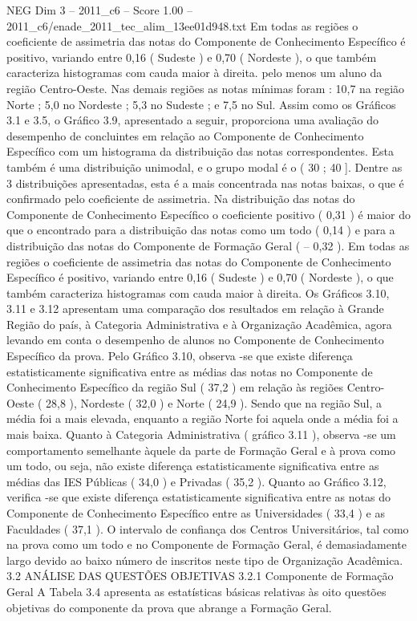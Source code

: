 \begin{textsample}{NEG Dim 3 – 2011\_c6 – Score 1.00 – 2011\_c6/enade\_2011\_tec\_alim\_13ee01d948.txt}
Em todas as regiões o coeficiente de assimetria das notas do Componente de Conhecimento Específico é positivo, variando entre 0,16 ( Sudeste ) e 0,70 ( Nordeste ), o que também caracteriza histogramas com cauda maior à direita. pelo menos um aluno da região Centro-Oeste.
Nas demais regiões as notas mínimas foram : 10,7 na região Norte ; 5,0 no Nordeste ; 5,3 no Sudeste ; e 7,5 no Sul.
Assim como os Gráficos 3.1 e 3.5, o Gráfico 3.9, apresentado a seguir, proporciona uma avaliação do desempenho de concluintes em relação ao Componente de Conhecimento Específico com um histograma da distribuição das notas correspondentes.
Esta também é uma distribuição unimodal, e o grupo modal é o ( 30 ; 40 ].
Dentre as 3 distribuições apresentadas, esta é a mais concentrada nas notas baixas, o que é confirmado pelo coeficiente de assimetria.
Na distribuição das notas do Componente de Conhecimento Específico o coeficiente positivo ( 0,31 ) é maior do que o encontrado para a distribuição das notas como um todo ( 0,14 ) e para a distribuição das notas do Componente de Formação Geral ( – 0,32 ).
Em todas as regiões o coeficiente de assimetria das notas do Componente de Conhecimento Específico é positivo, variando entre 0,16 ( Sudeste ) e 0,70 ( Nordeste ), o que também caracteriza histogramas com cauda maior à direita.
Os Gráficos 3.10, 3.11 e 3.12 apresentam uma comparação dos resultados em relação à Grande Região do país, à Categoria Administrativa e à Organização Acadêmica, agora levando em conta o desempenho de alunos no Componente de Conhecimento Específico da prova.
Pelo Gráfico 3.10, observa -se que existe diferença estatisticamente significativa entre as médias das notas no Componente de Conhecimento Específico da região Sul ( 37,2 ) em relação às regiões Centro-Oeste ( 28,8 ), Nordeste ( 32,0 ) e Norte ( 24,9 ).
Sendo que na região Sul, a média foi a mais elevada, enquanto a região Norte foi aquela onde a média foi a mais baixa.
Quanto à Categoria Administrativa ( gráfico 3.11 ), observa -se um comportamento semelhante àquele da parte de Formação Geral e à prova como um todo, ou seja, não existe diferença estatisticamente significativa entre as médias das IES Públicas ( 34,0 ) e Privadas ( 35,2 ).
Quanto ao Gráfico 3.12, verifica -se que existe diferença estatisticamente significativa entre as notas do Componente de Conhecimento Específico entre as Universidades ( 33,4 ) e as Faculdades ( 37,1 ).
O intervalo de confiança dos Centros Universitários, tal como na prova como um todo e no Componente de Formação Geral, é demasiadamente largo devido ao baixo número de inscritos neste tipo de Organização Acadêmica. 3.2 ANÁLISE DAS QUESTÕES OBJETIVAS 3.2.1 Componente de Formação Geral A Tabela 3.4 apresenta as estatísticas básicas relativas às oito questões objetivas do componente da prova que abrange a Formação Geral.

\end{textsample}
